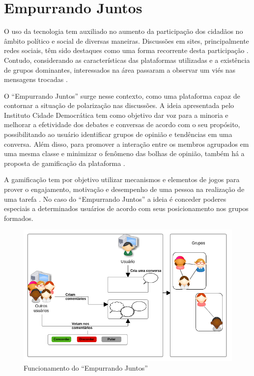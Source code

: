 \chapter{Empurrando Juntos} \label{cap:empurrandojuntos}

O uso da tecnologia tem auxiliado no aumento da participação dos 
cidadãos no âmbito político e social de diversas maneiras. Discussões em sites, principalmente redes sociais, têm sido
destaques como uma forma recorrente desta participação \cite{marques2008participaccao}.
Contudo, considerando as características das plataformas utilizadas e a existência de grupos dominantes, interessados
na área passaram a observar um viés nas mensagens trocadas \cite{empurrandojuntos, marques2008participaccao}. 

O ``Empurrando Juntos'' surge nesse contexto, como uma plataforma capaz de contornar a situação de polarização nas discussões.
A ideia apresentada pelo Instituto Cidade Democrática tem como objetivo dar voz para a minoria e 
melhorar a efetividade dos debates e conversas de acordo com o seu propósito, possibilitando ao usuário
identificar grupos de opinião e tendências em uma conversa. Além disso, para promover a interação entre os membros agrupados em uma mesma classe 
e minimizar o fenômeno das bolhas de opinião, também há a proposta de gamificação da plataforma \cite{empurrandojuntos}.

A gamificação tem por objetivo utilizar mecanismos e elementos de jogos para prover o engajamento, motivação e desempenho
de uma pessoa na realização de uma tarefa \cite{pedreira2015gamification}. No caso do ``Empurrando Juntos'' a ideia é conceder poderes
especiais a determinados usuários de acordo com seus posicionamento nos grupos formados.


\begin{figure}[h!]
\centering
\includegraphics[scale=0.7]{figuras/resumo_ej.png}
\caption{Funcionamento do ``Empurrando Juntos''}
\label{fig:resumo_ej}
\end{figure}

